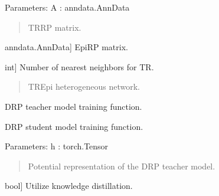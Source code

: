 \documentclass[letterpaper,10pt,english]{sphinxmanual}
\begin{document}
\begin{fulllineitems}
\begin{fulllineitems}
\sphinxAtStartPar
Parameters:
A : anndata.AnnData
\begin{quote}

\sphinxAtStartPar
TR\sphinxhyphen{}RP matrix.
\end{quote}
\begin{description}
\sphinxlineitem{B}{[}anndata.AnnData{]}
\sphinxAtStartPar
Epi\sphinxhyphen{}RP matrix.

\sphinxlineitem{n}{[}int{]}
\sphinxAtStartPar
Number of nearest neighbors for TR.

\end{description}
\begin{quote}\begin{description}
\sphinxAtStartPar
TR\sphinxhyphen{}Epi heterogeneous network.

\end{description}\end{quote}

\end{fulllineitems}


\begin{fulllineitems}
\label{\detokenize{index:TRAPT.DLVGAE.CalcSTM.init_cvae}}
\pysigstartsignatures
{}
\pysigstopsignatures
\sphinxAtStartPar
D\sphinxhyphen{}RP teacher model training function.

\end{fulllineitems}


\begin{fulllineitems}
\label{\detokenize{index:TRAPT.DLVGAE.CalcSTM.init_vgae}}
\pysigstartsignatures
{}
\pysigstopsignatures
\sphinxAtStartPar
D\sphinxhyphen{}RP student model training function.

\sphinxAtStartPar
Parameters:
h : torch.Tensor
\begin{quote}

\sphinxAtStartPar
Potential representation of the D\sphinxhyphen{}RP teacher model.
\end{quote}
\begin{description}
\sphinxlineitem{use\_kd}{[}bool{]}
\sphinxAtStartPar
Utilize knowledge distillation.


\end{description}
\end{fulllineitems}
\end{fulllineitems}
\end{document}
